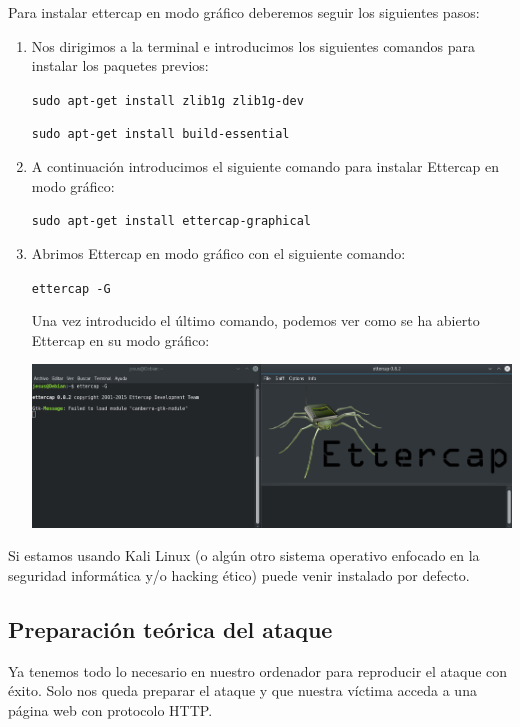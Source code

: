 Para instalar ettercap en modo gráfico deberemos seguir los siguientes pasos:
\begin{enumerate}
	\item Nos dirigimos a la terminal e introducimos los siguientes comandos para instalar los paquetes previos:
	\begin{center}
		\texttt{sudo apt-get install zlib1g zlib1g-dev}
		
		\texttt{sudo apt-get install build-essential}
		
	\end{center}
	\item A continuación introducimos el siguiente comando para instalar Ettercap en modo gráfico:
	\begin{center}
		\texttt{sudo apt-get install ettercap-graphical}
		
	\end{center}
	\item Abrimos Ettercap en modo gráfico con el siguiente comando:
	\begin{center}
		\texttt{ettercap -G}
	\end{center}
	Una vez introducido el último comando, podemos ver como se ha abierto Ettercap en su modo gráfico:
	\begin{center}
		\includegraphics[scale=0.28]{Ettercap.png}
	\end{center}
\end{enumerate}

\Nota Si estamos usando Kali Linux (o algún otro sistema operativo enfocado en la seguridad informática y/o hacking ético) puede venir instalado por defecto.

\subsection{Preparación teórica del ataque}
Ya tenemos todo lo necesario en nuestro ordenador para reproducir el ataque con éxito. Solo nos queda preparar el ataque y que nuestra víctima acceda a una página web con protocolo HTTP.

